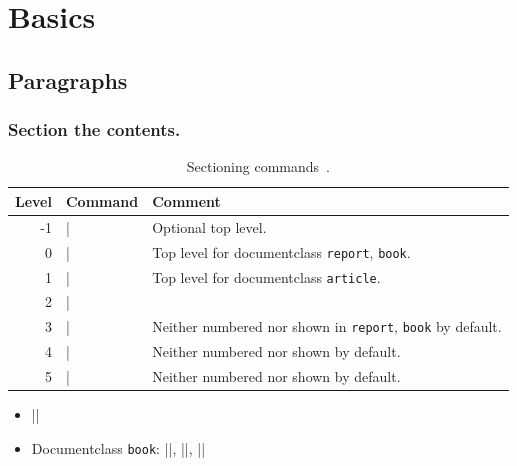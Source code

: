 \documentclass[CJKchecksingle]{beamer}
\newcommand{\pkg}[1]{\texttt{#1}}
\begin{document}
\section{Basics}

\subsection{Paragraphs}

\begin{frame}[fragile]\frametitle{Section the contents.}
\begin{table}[h]
  \centering
  \caption{Sectioning commands~\cite{leoliu}.}
  \begin{tabular}{rlp{}}
    \hline
    Level & Command & Comment \\
    \hline
    -1 & |\part| & Optional top level. \\
    0  & |\chapter| & Top level for documentclass \pkg{report}, \pkg{book}. \\
    1  & |\section| & Top level for documentclass \pkg{article}. \\
    2  & |\subsection| & \\
    3  & |\subsubsection| & Neither numbered nor shown in \pkg{report}, \pkg{book} by default.\\
    4  & |\paragraph| & Neither numbered nor shown by default.\\
    5  & |\subparagraph| & Neither numbered nor shown by default.\\
    \hline
  \end{tabular}
\end{table}

  \begin{itemize}
    \item |\appendix|
    \item Documentclass \pkg{book}: |\frontmatter|, |\mainmatter|,
      |\backmatter|
  \end{itemize}
\end{frame}
\end{document}
